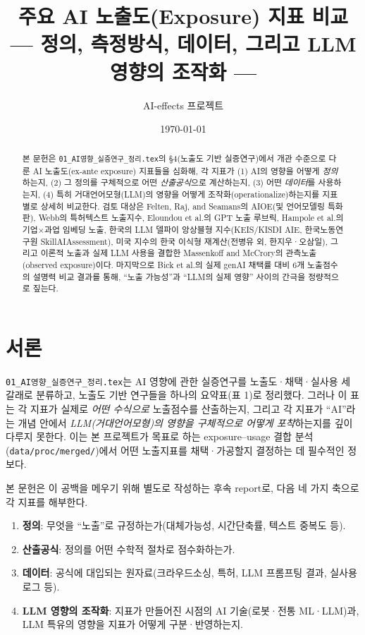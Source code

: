 \documentclass[11pt]{article}
\title{주요 AI 노출도(Exposure) 지표 비교\\[2mm]
\large --- 정의, 측정방식, 데이터, 그리고 LLM 영향의 조작화 ---}
\author{AI-effects 프로젝트}
\date{\today}
\begin{document}
\maketitle

\begin{abstract}
\noindent 본 문헌은 \texttt{01\_AI영향\_실증연구\_정리.tex}의 \S4(노출도 기반 실증연구)에서 개관 수준으로 다룬 AI 노출도(ex-ante exposure) 지표들을 심화해, 각 지표가 (1) AI의 영향을 어떻게 \emph{정의}하는지, (2) 그 정의를 구체적으로 어떤 \emph{산출공식}으로 계산하는지, (3) 어떤 \emph{데이터}를 사용하는지, (4) 특히 거대언어모형(LLM)의 영향을 어떻게 조작화(operationalize)하는지를 지표별로 상세히 비교한다. 검토 대상은 Felten, Raj, and Seamans의 AIOE(및 언어모델링 특화판), Webb의 특허텍스트 노출지수, Eloundou et al.의 GPT 노출 루브릭, Hampole et al.의 기업$\times$과업 임베딩 노출, 한국의 LLM 델파이 앙상블형 지수(KEIS/KISDI AIE, 한국노동연구원 SkillAIAssessment), 미국 지수의 한국 이식형 재계산(전병유 외, 한지우·오삼일), 그리고 이론적 노출과 실제 LLM 사용을 결합한 Massenkoff and McCrory의 관측노출(observed exposure)이다. 마지막으로 Bick et al.의 실제 genAI 채택률 대비 6개 노출점수의 설명력 비교 결과를 통해, ``노출 가능성''과 ``LLM의 실제 영향'' 사이의 간극을 정량적으로 짚는다.
\end{abstract}

\tableofcontents

\section{서론}

\texttt{01\_AI영향\_실증연구\_정리.tex}는 AI 영향에 관한 실증연구를 노출도·채택·실사용 세 갈래로 분류하고, 노출도 기반 연구들을 하나의 요약표(표 1)로 정리했다. 그러나 이 표는 각 지표가 실제로 \emph{어떤 수식으로} 노출점수를 산출하는지, 그리고 각 지표가 ``AI''라는 개념 안에서 \emph{LLM(거대언어모형)의 영향을 구체적으로 어떻게 포착}하는지를 깊이 다루지 못한다. 이는 본 프로젝트가 목표로 하는 exposure--usage 결합 분석(\texttt{data/proc/merged/})에서 어떤 노출지표를 채택·가공할지 결정하는 데 필수적인 정보다.

본 문헌은 이 공백을 메우기 위해 별도로 작성하는 후속 report로, 다음 네 가지 축으로 각 지표를 해부한다.

\begin{enumerate}[label=(\arabic*)]
  \item \textbf{정의}: 무엇을 ``노출''로 규정하는가(대체가능성, 시간단축률, 텍스트 중복도 등).
  \item \textbf{산출공식}: 정의를 어떤 수학적 절차로 점수화하는가.
  \item \textbf{데이터}: 공식에 대입되는 원자료(크라우드소싱, 특허, LLM 프롬프팅 결과, 실사용 로그 등).
  \item \textbf{LLM 영향의 조작화}: 지표가 만들어진 시점의 AI 기술(로봇·전통 ML·LLM)과, LLM 특유의 영향을 지표가 어떻게 구분·반영하는지.
\end{enumerate}
\end{document}
